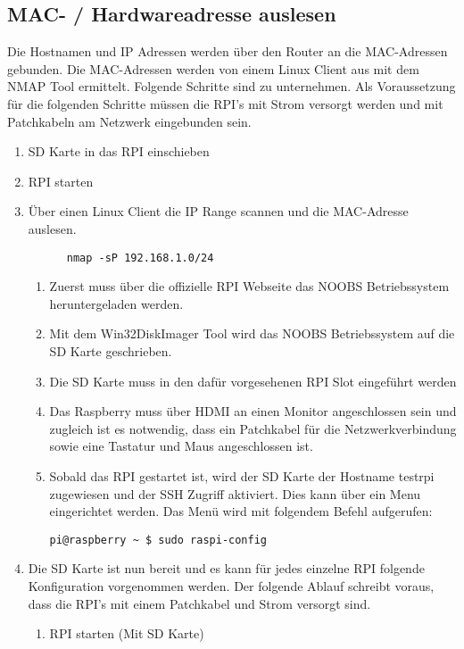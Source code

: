 \subsection{MAC- / Hardwareadresse auslesen}
Die Hostnamen und IP Adressen werden über den Router an die MAC-Adressen gebunden. Die MAC-Adressen werden von einem Linux Client aus mit dem NMAP Tool ermittelt. Folgende Schritte sind zu unternehmen. Als Voraussetzung für die folgenden Schritte müssen die RPI's mit Strom versorgt werden und mit Patchkabeln am Netzwerk eingebunden sein.
\begin{enumerate}
      \item SD Karte in das RPI einschieben
      \item RPI starten
      \item Über einen Linux Client die IP Range scannen und die MAC-Adresse auslesen.
      \begin{verbatim}
	  nmap -sP 192.168.1.0/24      
      \end{verbatim}
      \begin{enumerate}
         \item Zuerst muss über die offizielle RPI Webseite das NOOBS Betriebssystem heruntergeladen werden.
         \item Mit dem Win32DiskImager Tool wird das NOOBS Betriebssystem auf die SD Karte geschrieben.
         \item Die SD Karte muss in den dafür vorgesehenen RPI Slot eingeführt werden
         \item Das Raspberry muss über HDMI an einen Monitor angeschlossen sein und zugleich ist es notwendig, dass ein Patchkabel für die Netzwerkverbindung sowie eine Tastatur und Maus angeschlossen ist.
         \item Sobald das RPI gestartet ist, wird der SD Karte der Hostname testrpi zugewiesen und der SSH Zugriff aktiviert. Dies kann über ein Menu eingerichtet werden. Das Menü wird mit folgendem Befehl aufgerufen:
         \begin{verbatim}
pi@raspberry ~ $ sudo raspi-config
\end{verbatim}
       \end{enumerate}
      \item Die SD Karte ist nun bereit und es kann für jedes einzelne RPI folgende Konfiguration vorgenommen werden. Der folgende Ablauf schreibt voraus, dass die RPI's mit einem Patchkabel und Strom versorgt sind.
      \begin{enumerate}
      \item RPI starten (Mit SD Karte)

\end{enumerate}
\end{enumerate}
